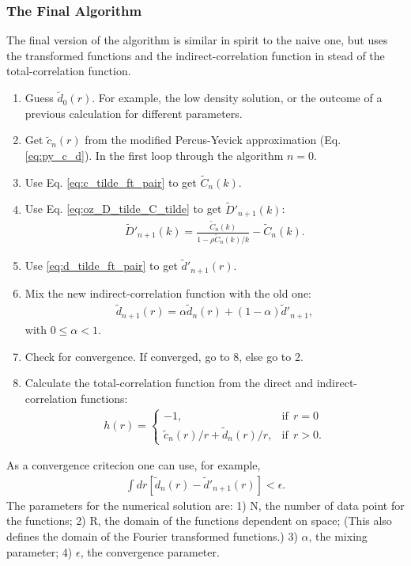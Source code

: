 \subsubsection{The Final Algorithm}
The final version of the algorithm is similar in spirit to the naive one, but uses the transformed functions and the indirect-correlation function in stead of the total-correlation function.
\begin{enumerate}
\item  Guess $\tilde{d}_0(r)$. For example, the low density solution, or the outcome of a previous calculation for different parameters.
\item Get $\tilde{c}_n(r)$ from the modified Percus-Yevick approximation (Eq. \eqref{eq:py_c_d}).
In the first loop through the algorithm $n=0$.
\item Use Eq. \eqref{eq:c_tilde_ft_pair} to get $\tilde{C}_n(k)$.
\item Use Eq. \eqref{eq:oz_D_tilde_C_tilde} to get $\tilde{D}'_{n+1}(k)$:
\begin{align}
\tilde{D}'_{n+1}(k) = \frac{\tilde{C}_n(k)}{1-\rho \tilde{C}_n(k)/k} - \tilde{C}_n(k).
\end{align}
\item Use \eqref{eq:d_tilde_ft_pair} to get $\tilde{d}'_{n+1}(r)$.
\item Mix the new indirect-correlation function with the old one:
\begin{align}
\tilde{d}_{n+1}(r) = \alpha \tilde{d}_n(r) + 
    (1-\alpha) \tilde{d}'_{n+1},
\end{align}
with $0 \leq \alpha < 1$.
\item Check for convergence. If converged, go to 8, else go to 2.
\item  Calculate the total-correlation function from the direct and indirect-correlation functions:
\begin{align}
h(r) = 
\begin{cases}
    -1 ,&\text{if}~~ r = 0\\
    \tilde{c}_n(r)/r + \tilde{d}_n(r)/r ,& \text{if}~~ r>0.
\end{cases}
\end{align}
\end{enumerate}
As a convergence critecion one can use, for example,
\begin{align}
\int dr \left[ \tilde{d}_n(r) - \tilde{d}'_{n+1}(r) \right]
< \epsilon.
\end{align}
The parameters for the numerical solution are: 1) N, the number of data point for the functions;
2) R, the domain of the functions dependent on space;
(This also defines the domain of the Fourier transformed functions.)
3) $\alpha$, the mixing parameter;
4) $\epsilon$, the convergence parameter.
